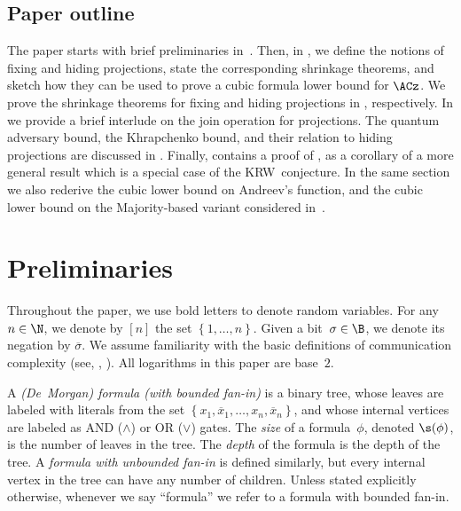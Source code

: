 \documentclass{toc}
\begin{document}
%
\subsection{Paper outline}   %

The paper starts with brief preliminaries in~. Then,
in , we define the notions of fixing and hiding
projections, state the corresponding shrinkage theorems, and sketch
how they can be used to prove a cubic formula lower bound for $\ACz$.
We prove the shrinkage theorems for fixing and hiding projections in
, %
 respectively.
In  we provide a brief interlude on the join operation
for projections. The quantum adversary bound, the Khrapchenko bound,
and their relation to hiding projections are discussed in .
Finally,  contains a proof of ,
as a corollary of a more general result which is a special case of
the KRW~conjecture. In the same section we also rederive the cubic
lower bound on Andreev's function, and the cubic lower bound on the
Majority-based variant considered in~\cite{GTN19}.

\section{\label{sec:prel}Preliminaries}

Throughout the paper, we use bold letters to denote random variables.
For any $n\in\N$, we denote by $\left[n\right]$ the set $\left\{ 1,\ldots,n\right\} $.
Given a bit~$\sigma\in\B$, we denote its negation by $\overline{\sigma}$.
We assume familiarity with the basic definitions of communication
complexity (see, \eg, \cite{KN_book}). All logarithms in this paper
are base~$2$. 
\begin{definition}
A \emph{(De~Morgan) formula (with bounded fan-in)} is a binary tree,
whose leaves are labeled with literals from the set $\left\{ x_{1},\overline{x}_{1},\ldots,x_{n},\overline{x}_{n}\right\} $,
and whose internal vertices are labeled as AND ($\wedge$) or OR ($\vee$)
gates. The \emph{size} of a formula~$\phi$, denoted $\s(\phi)$,
is the number of leaves in the tree. The \emph{depth} of the formula
is the depth of the tree. A \emph{formula with unbounded fan-in} is
defined similarly, but every internal vertex in the tree can have
any number of children. Unless stated explicitly otherwise, whenever
we say ``formula'' we refer to a formula with bounded fan-in. 
\end{definition}
\end{document}
